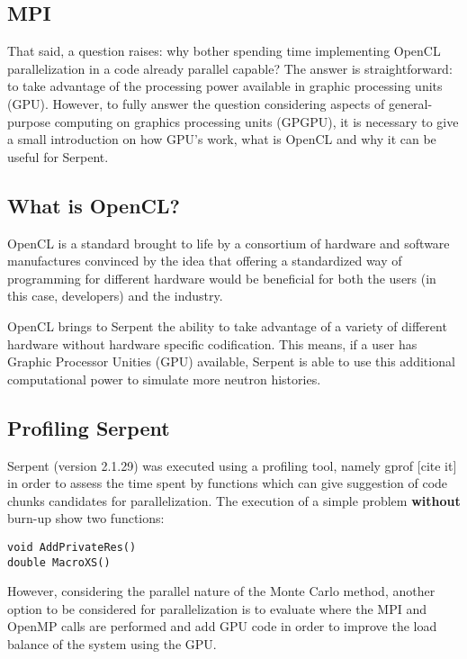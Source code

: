 \documentclass[twoside,a4paper,12pt,english]{anstrans}
\begin{document}
\subsection{MPI}

That said, a question raises: why bother spending time implementing OpenCL parallelization
in a code already parallel capable? The answer is straightforward: to take
advantage of the processing power available in graphic processing units (GPU).
However, to fully answer the question considering aspects of general-purpose computing on graphics
processing units (GPGPU), it is necessary to give a small introduction on how GPU's work, what is OpenCL and why
it can be useful for Serpent.



\subsection{What is OpenCL?}

OpenCL\cite{Stone2010} is a standard brought to life by a consortium of hardware and software
manufactures convinced by the idea that offering a standardized way of programming for different
hardware would be beneficial for both the users (in this case, developers) and the industry.

OpenCL brings to Serpent the ability to take advantage of a variety of different hardware
without hardware specific codification. This means, if a user has Graphic Processor Unities (GPU)
available, Serpent is able to use this additional computational power to simulate
more neutron histories.


\subsection{Profiling Serpent}

Serpent (version 2.1.29) was executed using a profiling tool, namely gprof [cite it] in order
to assess the time spent by functions which can give suggestion of code chunks candidates for
parallelization. The execution of a simple problem \textbf{without} burn-up show two functions:
\begin{verbatim}
void AddPrivateRes()
double MacroXS()
\end{verbatim}
However, considering the parallel nature of the Monte Carlo method, another option to be considered
for parallelization is to evaluate where the MPI and OpenMP calls are performed and add GPU code
in order to improve the load balance of the system using the GPU.
\end{document}
